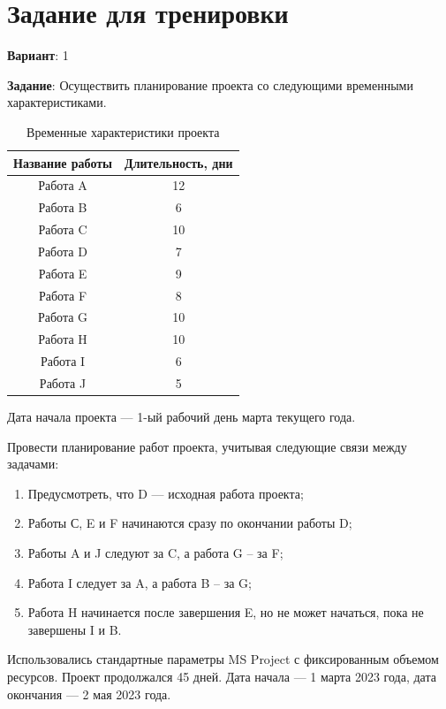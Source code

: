 \chapter{Задание для тренировки}

\textbf{Вариант}: 1

\textbf{Задание}: Осуществить планирование проекта со следующими временными характеристиками.

\begin{table}[!h]
	\begin{center}
		\caption{Временные характеристики проекта}
		\begin{tabular}{|c|c|}
			\hline
			\bfseries Название работы & \bfseries Длительность, дни \\\hline
			Работа A & 12 \\\hline
			Работа B & 6 \\\hline
			Работа C & 10 \\\hline
			Работа D & 7 \\\hline
			Работа E & 9 \\\hline
			Работа F & 8 \\\hline
			Работа G & 10 \\\hline
			Работа H & 10 \\\hline
			Работа I & 6 \\\hline
			Работа J & 5 \\
			\hline
		\end{tabular}
	\end{center}
\end{table}

Дата начала проекта --- 1-ый рабочий день марта текущего года.

Провести планирование работ проекта, учитывая следующие связи между задачами:
\begin{enumerate}
	\item Предусмотреть, что D --- исходная работа проекта;
	\item Работы С, E и F начинаются сразу по окончании работы D;
	\item Работы A и J следуют за C, а работа G – за F;
	\item Работа I следует за A, а работа B – за G;
	\item Работа H начинается после завершения E, но не может начаться, пока не
	завершены I и B.
\end{enumerate}

Использовались стандартные параметры MS Project с фиксированным объемом ресурсов. Проект продолжался 45 дней. Дата начала --- 1 марта 2023 года, дата окончания --- 2 мая 2023 года.

